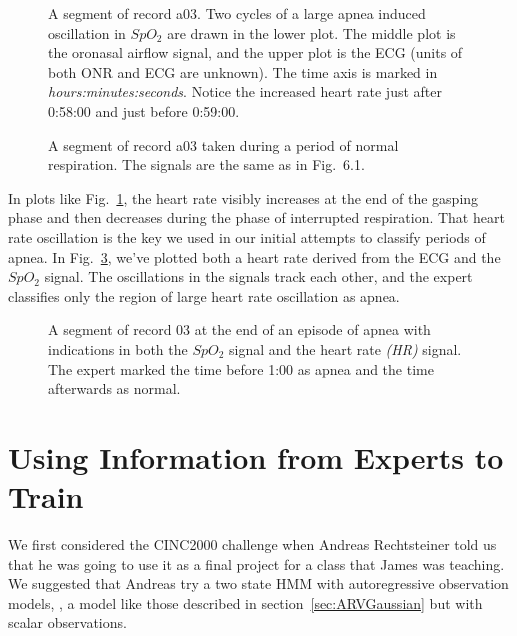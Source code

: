 \begin{figure}
  \caption[A segment of record a03]%
  {A segment of record a03.  Two cycles of a large apnea
    induced oscillation in $SpO_2$ are drawn in the lower plot.  The
    middle plot is the oronasal airflow signal, and the upper plot is
    the ECG (units of both ONR and ECG are unknown).  The time
    axis is marked in \emph{hours:minutes:seconds}.  Notice the increased
    heart rate just after 0:58:00 and just before 0:59:00.}
  \label{fig:a03erA}
\end{figure}

\begin{figure}
  \caption[A segment of record a03]%
  {A segment of record a03 taken during a period of normal
    respiration.  The signals are the same as in Fig.~6.1.}
  \label{fig:a03erN}
\end{figure}

In plots like Fig.~\ref{fig:a03erA}, the heart rate visibly increases
at the end of the gasping phase and then decreases during the phase of
interrupted respiration.  That heart rate oscillation is the key we
used in our initial attempts to classify periods of apnea.  In
Fig.~\ref{fig:a03erHR}, we've plotted both a heart rate derived from
the ECG  and the $SpO_2$
signal.  The oscillations in the signals track each other, and the
expert classifies only the region of large heart rate oscillation as
apnea.
\begin{figure}
  \caption[A segment of record 03 at the end of an episode of apnea]%
  {A segment of record 03 at the end of an episode of apnea with
    indications in both the $SpO_2$ signal and the heart rate
    \emph{(HR)} signal.  The expert marked the time before 1:00 as
    apnea and the time afterwards as normal.}
  \label{fig:a03erHR}
\end{figure}

\section{Using Information from Experts to Train}

We first considered the CINC2000 challenge when Andreas Rechtsteiner
told us that he was going to use it as a final project for a class
that James was teaching.  We suggested that Andreas try a two state
HMM with autoregressive observation models, \ie, a model like those
described in section~\ref{sec:ARVGaussian} but with scalar
observations.

